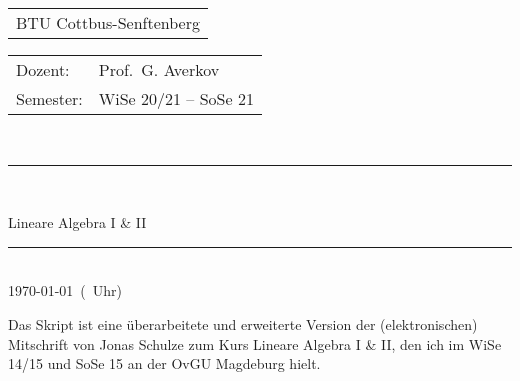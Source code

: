 
\begin{tabular}{l}
BTU Cottbus-Senftenberg
\end{tabular}

\vspace{2cm}

\begin{tabular}{ll}
	Dozent: & Prof.~G. Averkov
\\  Semester: & WiSe 20/21 -- SoSe 21
\end{tabular}
\vspace{3cm}
\\
\rule{\linewidth}{0.5mm}\\[0.4cm]
\begin{huge}
Lineare Algebra I \& II\\
\end{huge}
\rule{\linewidth}{0.5mm}\\[1.5cm]
%
\today\ (\thistime\ Uhr)

\vspace{8cm} 

Das Skript ist eine überarbeitete und erweiterte Version der (elektronischen) Mitschrift von Jonas Schulze zum Kurs Lineare Algebra I \& II, den ich im WiSe 14/15 und  SoSe 15 an der OvGU Magdeburg hielt. 


\thispagestyle{empty}


\newpage
